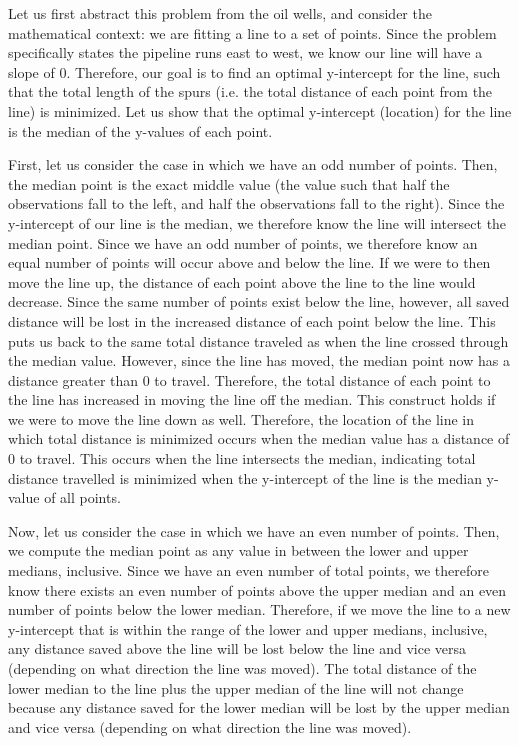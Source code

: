 \documentclass[11pt]{article}
\begin{document}
Let us first abstract this problem from the oil wells, and consider the mathematical context: we are fitting a line to a set of points. Since the problem specifically states the pipeline runs east to west, we know our line will have a slope of 0. Therefore, our goal is to find an optimal y-intercept for the line, such that the total length of the spurs (i.e. the total distance of each point from the line) is minimized. Let us show that the optimal y-intercept (location) for the line is the median of the y-values of each point.

First, let us consider the case in which we have an odd number of points. Then, the median point is the exact middle value (the value such that half the observations fall to the left, and half the observations fall to the right). Since the y-intercept of our line is the median, we therefore know the line will intersect the median point. Since we have an odd number of points, we therefore know an equal number of points will occur above and below the line. If we were to then move the line up, the distance of each point above the line to the line would decrease. Since the same number of points exist below the line, however, all saved distance will be lost in the increased distance of each point below the line. This puts us back to the same total distance traveled as when the line crossed through the median value. However, since the line has moved, the median point now has a distance greater than 0 to travel. Therefore, the total distance of each point to the line has increased in moving the line off the median. This construct holds if we were to move the line down as well. Therefore, the location of the line in which total distance is minimized occurs when the median value has a distance of 0 to travel. This occurs when the line intersects the median, indicating total distance travelled is minimized when the y-intercept of the line is the median y-value of all points.

Now, let us consider the case in which we have an even number of points. Then, we compute the median point as any value in between the lower and upper medians, inclusive. Since we have an even number of total points, we therefore know there exists an even number of points above the upper median and an even number of points below the lower median. Therefore, if we move the line to a new y-intercept that is within the range of the lower and upper medians, inclusive, any distance saved above the line will be lost below the line and vice versa (depending on what direction the line was moved). The total distance of the lower median to the line plus the upper median of the line will not change because any distance saved for the lower median will be lost by the upper median and vice versa (depending on what direction the line was moved).
\end{document}

